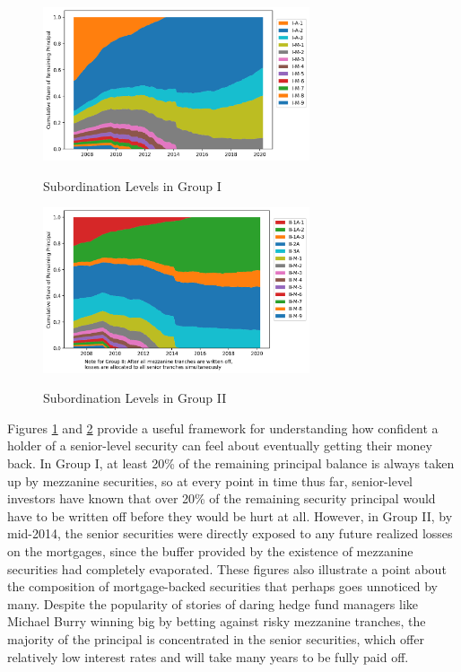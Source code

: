 \documentclass[12pt]{article}
\begin{document}
\begin{figure}[h]
	\centering
	\caption{Subordination Levels in Group I}
	\includegraphics[width=0.7\textwidth]{../figures/stackplot_share_of_principal_group_i}
	\label{fig:stackplot_share_of_principal_group_i}
\end{figure}

\begin{figure}[h]
	\centering
	\caption{Subordination Levels in Group II}
	\includegraphics[width=0.7\textwidth]{../figures/stackplot_share_of_principal_group_ii}
	\label{fig:stackplot_share_of_principal_group_ii}
\end{figure}

Figures \ref{fig:stackplot_share_of_principal_group_i} and \ref{fig:stackplot_share_of_principal_group_ii} provide a useful framework for understanding how confident a holder of a senior-level security can feel about eventually getting their money back. In Group I, at least 20\% of the remaining principal balance is always taken up by mezzanine securities, so at every point in time thus far, senior-level investors have known that over 20\% of the remaining security principal would have to be written off before they would be hurt at all. However, in Group II, by mid-2014, the senior securities were directly exposed to any future realized losses on the mortgages, since the buffer provided by the existence of mezzanine securities had completely evaporated. These figures also illustrate a point about the composition of mortgage-backed securities that perhaps goes unnoticed by many. Despite the popularity of stories of daring hedge fund managers like Michael Burry winning big by betting against risky mezzanine tranches, the majority of the principal is concentrated in the senior securities, which offer relatively low interest rates and will take many years to be fully paid off.
\end{document}
